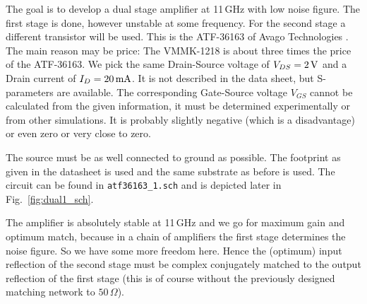 
The goal is to develop a dual stage amplifier at 11\,GHz with low
noise figure. The first stage is done, however unstable at some
frequency. For the second stage a different transistor will be
used. This is the ATF-36163 of Avago Technologies
\cite{avagoatf36163}. The main reason may be price: The VMMK-1218 is
about three times the price of the ATF-36163. We pick the same
Drain-Source voltage of $V_{DS}=2\,\mathrm{V}$ and a Drain current of
$I_D=20\,\mathrm{mA}$. It is not described in the data sheet, but
S-parameters are available. The corresponding Gate-Source voltage
$V_{GS}$ cannot be calculated from the given information, it must be
determined experimentally or from other simulations. It is probably
slightly negative (which is a disadvantage) or even zero or very close
to zero.

The source must be as well connected to ground as possible. The
footprint as given in the datasheet is used and the same substrate as
before is used. The circuit can be found in {\tt atf36163\_1.sch} and
is depicted later in Fig.~\ref{fig:dual1_sch}.


The amplifier is absolutely stable at 11\,GHz and we go for
maximum gain and optimum match, because in a chain of amplifiers the
first stage determines the noise figure. So we have some more freedom
here. Hence the (optimum) input reflection of the second stage must be
complex conjugately matched to the output reflection of the first
stage (this is of course without the previously designed matching
network to $50\,\Omega$).

